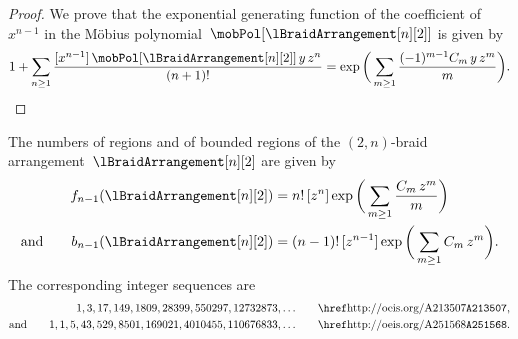 \begin{proof}
We prove that the exponential generating function of the coefficient of~$x^{n-1}$ in the M\"obius polynomial~$\mobPol[{\lBraidArrangement[n][2]}]$ is given by
\[
1 + \sum_{n \ge 1} \frac{[x^{n-1}] \, \mobPol[{\lBraidArrangement[n][2]}] \, y \, z^n}{(n+1)!} = \exp \bigg( \sum_{m \ge 1} \frac{(-1)^{m-1} C_m \, y \, z^m}{m} \bigg).
\]
\end{proof}

\begin{corollary}
The numbers of regions and of bounded regions of the $(2,n)$-braid arrangement~$\lBraidArrangement[n][2]$ are given by
\begin{align*}
f_{n-1}(\lBraidArrangement[n][2]) 
& = n! \, [z^n] \exp \bigg( \sum_{m \ge 1} \frac{C_m \, z^m}{m} \bigg) \\
\text{and}\qquad
b_{n-1}(\lBraidArrangement[n][2]) 
& = (n-1)! \, [z^{n-1}] \exp \bigg( \sum_{m \ge 1} C_m \, z^m \bigg).
\end{align*}
The corresponding integer sequences are
\begin{align*}
1, 3, 17, 149, 1809, 28399, 550297, 12732873, \dots & \qquad \text{\OEIS{A213507}}, \\
\text{and}\qquad
1, 1, 5, 43, 529, 8501, 169021, 4010455, 110676833, \dots & \qquad \text{\OEIS{A251568}}.
\end{align*}
\end{corollary}

